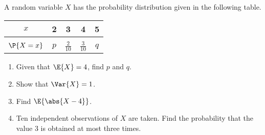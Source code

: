 \begin{problem}
    A random variable $X$ has the probability distribution given in the following table.

    \begin{table}[H]
        \centering
        \begin{tabular}{|c|c|c|c|c|}
        \hline
        $x$ & 2 & 3 & 4 & 5 \\ \hline
        &&&&\\[-1em]
        $\P{X = x}$ & $p$ & $\frac2{10}$ & $\frac3{10}$ & $q$ \\[0.2em] \hline
        \end{tabular}
    \end{table}

    \begin{enumerate}
        \item Given that $\E{X} = 4$, find $p$ and $q$.
        \item Show that $\Var{X} = 1$.
        \item Find $\E{\abs{X - 4}}$.
        \item Ten independent observations of $X$ are taken. Find the probability that the value 3 is obtained at most three times.
    \end{enumerate}
\end{problem}


